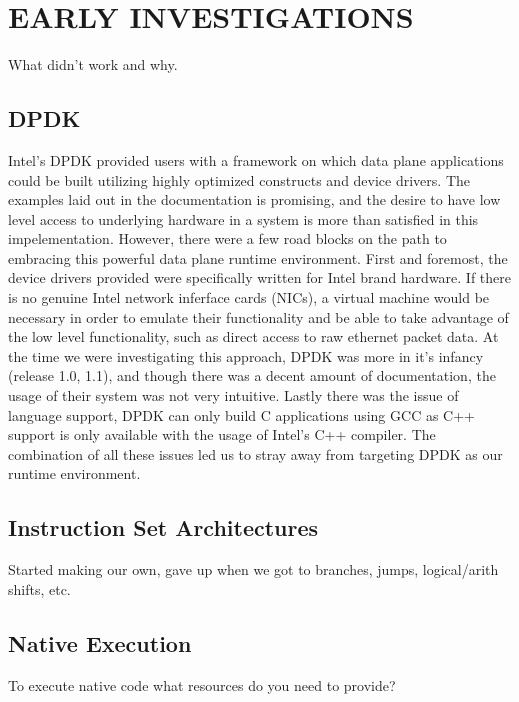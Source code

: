 \chapter{EARLY INVESTIGATIONS}
\label{invest}
What didn't work and why.

\section{DPDK}
\label{invest:dpdk}
Intel's DPDK provided users with a framework on which data plane applications
could be built utilizing highly optimized constructs and device drivers. The
examples laid out in the documentation is promising, and the desire to have
low level access to underlying hardware in a system is more than satisfied
in this impelementation. However, there were a few road blocks on the path to
embracing this powerful data plane runtime environment. First and foremost, the
device drivers provided were specifically written for Intel brand hardware. If
there is no genuine Intel network inferface cards (NICs), a virtual machine
would be necessary in order to emulate their functionality and be able to take
advantage of the low level functionality, such as direct access to raw
ethernet packet data. At the time we were investigating this approach, DPDK was
more in it's infancy (release 1.0, 1.1), and though there was a decent amount
of documentation, the usage of their system was not very intuitive. Lastly
there was the issue of language support, DPDK can only build C applications
using GCC as C++ support is only available with the usage of Intel's C++
compiler. The combination of all these issues led us to stray away from
targeting DPDK as our runtime environment.

\section{Instruction Set Architectures}
\label{invest:isa}
Started making our own, gave up when we got to branches, jumps, logical/arith shifts, etc.

\section{Native Execution}
\label{invest:native}
To execute native code what resources do you need to provide?